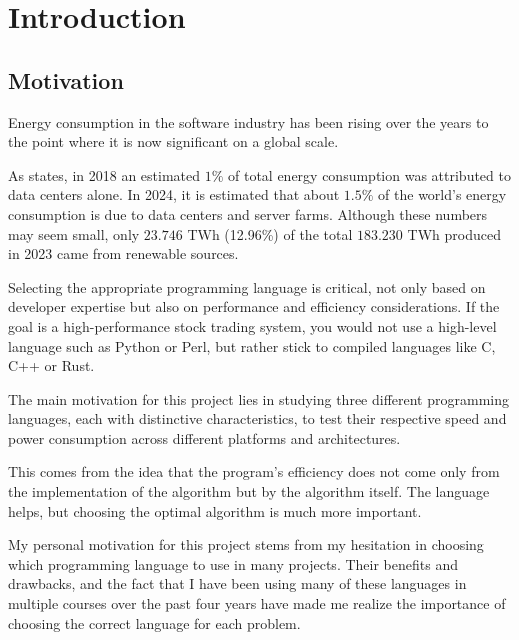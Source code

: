 \chapter{Introduction}\label{chap:introduction}



\section{Motivation}\label{sec:motivation}
Energy consumption in the software industry has been rising over the years to the point where it is now significant on a global scale. %

As \cite{recalibrating-datacenter} states, in 2018 an estimated $1\%$ of total energy consumption was attributed to data centers alone. In 2024, it is estimated that about $1.5\%$ of the world's energy consumption is due to data centers and server farms. Although these numbers may seem small, only $23.746$ TWh (12.96\%) of the total $183.230$ TWh produced in 2023 \cite{energy-production-consumption} came from renewable sources.

Selecting the appropriate programming language is critical, not only based on developer expertise but also on performance and efficiency considerations. If the goal is a high-performance stock trading system, you would not use a high-level language such as Python or Perl, but rather stick to compiled languages like C, C++ or Rust.

The main motivation for this project lies in studying three different programming languages, each with distinctive characteristics, to test their respective speed and power consumption across different platforms and architectures.

This comes from the idea that the program's efficiency does not come only from the implementation of the algorithm but by the algorithm itself. The language helps, but choosing the optimal algorithm is much more important.

My personal motivation for this project stems from my hesitation in choosing which programming language to use in many projects. Their benefits and drawbacks, and the fact that I have been using many of these languages in multiple courses over the past four years have made me realize the importance of choosing the correct language for each problem.


